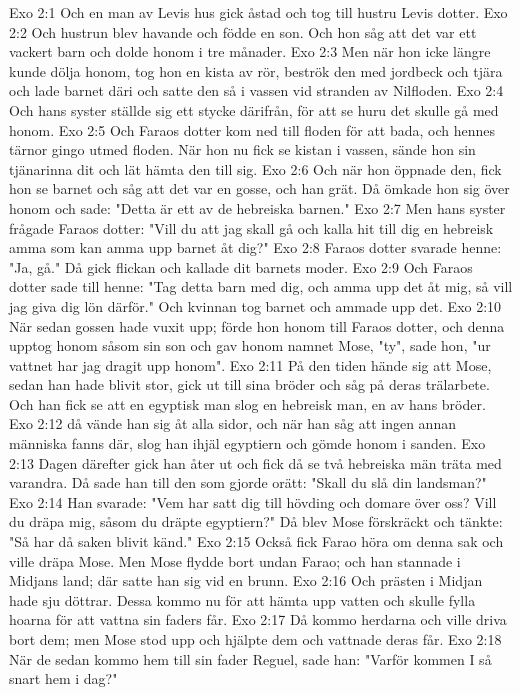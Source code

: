 Exo 2:1  Och en man av Levis hus gick åstad och tog till hustru Levis dotter.
Exo 2:2  Och hustrun blev havande och födde en son. Och hon såg att det var ett vackert barn och dolde honom i tre månader.
Exo 2:3  Men när hon icke längre kunde dölja honom, tog hon en kista av rör, beströk den med jordbeck och tjära och lade barnet däri och satte den så i vassen vid stranden av Nilfloden.
Exo 2:4  Och hans syster ställde sig ett stycke därifrån, för att se huru det skulle gå med honom.
Exo 2:5  Och Faraos dotter kom ned till floden för att bada, och hennes tärnor gingo utmed floden. När hon nu fick se kistan i vassen, sände hon sin tjänarinna dit och lät hämta den till sig.
Exo 2:6  Och när hon öppnade den, fick hon se barnet och såg att det var en gosse, och han grät. Då ömkade hon sig över honom och sade: "Detta är ett av de hebreiska barnen."
Exo 2:7  Men hans syster frågade Faraos dotter: "Vill du att jag skall gå och kalla hit till dig en hebreisk amma som kan amma upp barnet åt dig?"
Exo 2:8  Faraos dotter svarade henne: "Ja, gå." Då gick flickan och kallade dit barnets moder.
Exo 2:9  Och Faraos dotter sade till henne: "Tag detta barn med dig, och amma upp det åt mig, så vill jag giva dig lön därför." Och kvinnan tog barnet och ammade upp det.
Exo 2:10  När sedan gossen hade vuxit upp; förde hon honom till Faraos dotter, och denna upptog honom såsom sin son och gav honom namnet Mose, "ty", sade hon, "ur vattnet har jag dragit upp honom".
Exo 2:11  På den tiden hände sig att Mose, sedan han hade blivit stor, gick ut till sina bröder och såg på deras trälarbete. Och han fick se att en egyptisk man slog en hebreisk man, en av hans bröder.
Exo 2:12  då vände han sig åt alla sidor, och när han såg att ingen annan människa fanns där, slog han ihjäl egyptiern och gömde honom i sanden.
Exo 2:13  Dagen därefter gick han åter ut och fick då se två hebreiska män träta med varandra. Då sade han till den som gjorde orätt: "Skall du slå din landsman?"
Exo 2:14  Han svarade: "Vem har satt dig till hövding och domare över oss? Vill du dräpa mig, såsom du dräpte egyptiern?" Då blev Mose förskräckt och tänkte: "Så har då saken blivit känd."
Exo 2:15  Också fick Farao höra om denna sak och ville dräpa Mose. Men Mose flydde bort undan Farao; och han stannade i Midjans land; där satte han sig vid en brunn.
Exo 2:16  Och prästen i Midjan hade sju döttrar. Dessa kommo nu för att hämta upp vatten och skulle fylla hoarna för att vattna sin faders får.
Exo 2:17  Då kommo herdarna och ville driva bort dem; men Mose stod upp och hjälpte dem och vattnade deras får.
Exo 2:18  När de sedan kommo hem till sin fader Reguel, sade han: "Varför kommen I så snart hem i dag?"
